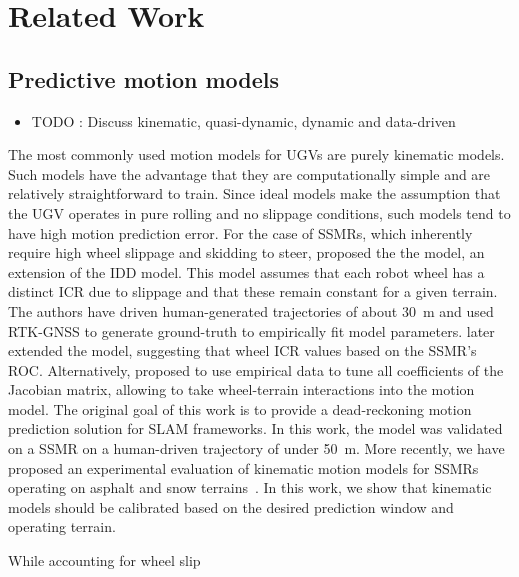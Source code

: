 \section{Related Work}

\lightlipsum[1]

\subsection{Predictive motion models}

\begin{itemize}
	\item TODO : Discuss kinematic, quasi-dynamic, dynamic and data-driven
\end{itemize}

The most commonly used motion models for \acp{UGV} are purely kinematic models.
Such models have the advantage that they are computationally simple and are relatively straightforward to train.
Since ideal models make the assumption that the \ac{UGV} operates in pure rolling and no slippage conditions, such models tend to have high motion prediction error.
For the case of \acp{SSMR}, which inherently require high wheel slippage and skidding to steer, \citet{Mandow2007} proposed the the \ICRBASED model, an extension of the \ac{IDD} model.
This model assumes that each robot wheel has a distinct \ac{ICR} due to slippage and that these remain constant for a given terrain. 
The authors have driven human-generated trajectories of about \SI{30}{\meter} and used \ac{RTK}-\ac{GNSS} to generate ground-truth to empirically fit model parameters.
\citet{Wang2015} later extended the \ICRBASED model, suggesting that wheel \ac{ICR} values based on the \ac{SSMR}'s \ac{ROC}. 
Alternatively, \citet{Anousaki2004} proposed to use empirical data to tune all coefficients of the Jacobian matrix, allowing to take wheel-terrain interactions into the motion model.
The original goal of this work is to provide a dead-reckoning motion prediction solution for \ac{SLAM} frameworks. 
In this work, the model was validated on a \ac{SSMR} on a human-driven trajectory of under \SI{50}{\meter}.
More recently, we have proposed an experimental evaluation of kinematic motion models for \acp{SSMR} operating on asphalt and snow terrains~\citep{Baril2020}. 
In this work, we show that kinematic models should be calibrated based on the desired prediction window and operating terrain. 

While accounting for wheel slip



